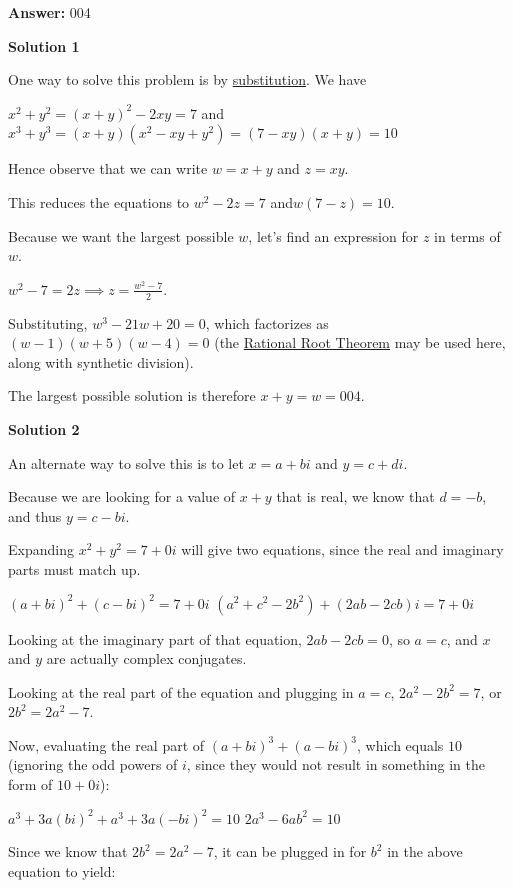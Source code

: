 \begin{enumerate}
 
 \textbf{Answer: }004



\textbf{Solution 1}

One way to solve this problem is by \href{https://artofproblemsolving.com/wiki/index.php?title=Substitution}{substitution}. We have

 $x^2+y^2=(x+y)^2-2xy=7$ and$x^3+y^3=(x+y)(x^2-xy+y^2)=(7-xy)(x+y)=10$

 Hence observe that we can write $w=x+y$ and $z=xy$.

 This reduces the equations to $w^2-2z=7$ and$w(7-z)=10$.

 Because we want the largest possible $w$, let's find an expression for $z$ in terms of $w$.

 $w^2-7=2z \implies z=\frac{w^2-7}{2}$.

 Substituting, $w^3-21w+20=0$, which factorizes as $(w-1)(w+5)(w-4)=0$  (the \href{https://artofproblemsolving.com/wiki/index.php?title=Rational\_Root\_Theorem}{Rational Root Theorem} may be used here, along with synthetic division).

 The largest possible solution is therefore $x+y=w=\boxed{004}$.

 



\textbf{Solution 2}

An alternate way to solve this is to let $x=a+bi$ and $y=c+di$.

 Because we are looking for a value of $x+y$ that is real, we know that $d=-b$, and thus $y=c-bi$.

 Expanding $x^2+y^2=7+0i$ will give two equations, since the real and imaginary parts must match up.

 $(a+bi)^2+(c-bi)^2=7+0i$
$(a^2+c^2-2b^2)+(2ab-2cb)i=7+0i$

 Looking at the imaginary part of that equation, $2ab-2cb=0$, so $a=c$, and $x$ and $y$ are actually complex conjugates.

 Looking at the real part of the equation and plugging in $a=c$, $2a^2-2b^2=7$, or $2b^2=2a^2-7$.

 Now, evaluating the real part of $(a+bi)^3+(a-bi)^3$, which equals $10$ (ignoring the odd powers of $i$, since they would not result in something in the form of $10+0i$):

 $a^3+3a(bi)^2+a^3+3a(-bi)^2=10$
$2a^3-6ab^2=10$

 Since we know that $2b^2=2a^2-7$, it can be plugged in for $b^2$ in the above equation to yield:


\end{enumerate}
